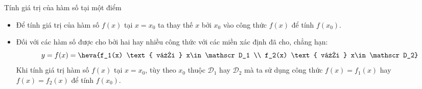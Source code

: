 \begin{dang}{Tính giá trị của hàm số tại một điểm}
	\begin{itemize}
		\item  Để tính giá trị của hàm số $f(x)$ tại $x=x_0$ ta thay thế $x$ bởi $x_0$ vào công thức $f(x)$ để tính $f(x_0)$.
		\item  Đối với các hàm số được cho bởi hai hay nhiều công thức với các miền xác định đã cho, chẳng hạn:
		$$y=f(x)=\heva{f_1(x) \text{ với } x\in \mathscr D_1 \\ f_2(x) \text{ với } x\in \mathscr  D_2}$$
		Khi tính giá trị hàm số $f(x)$ tại $x=x_0$, tùy theo $x_0$ thuộc $\mathscr D_1$ hay $\mathscr D_2$ mà ta sử dụng công thức $f(x)=f_1(x)$ hay $f(x)=f_2(x)$ để tính $f(x_0)$.
	\end{itemize}
\end{dang}
